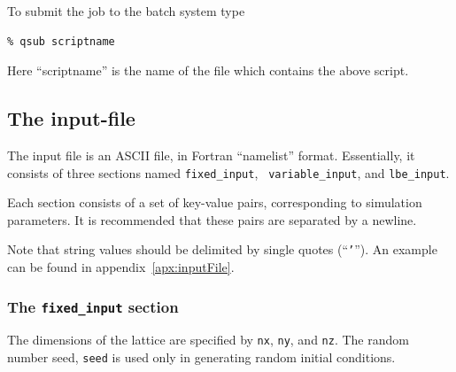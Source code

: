 \documentclass[a4paper]{article}
\begin{document}
To submit the job to the batch system type 
\begin{verbatim}
% qsub scriptname 
\end{verbatim}

Here ``scriptname'' is the name of the file which contains the above script.


\subsection{The input-file}
\label{sec:inputFile}

The input file is an ASCII file, in Fortran ``namelist'' format.
Essentially, it consists of three sections named {\tt fixed\_input}, {\tt
variable\_input}, and {\tt lbe\_input}. 

Each section consists of a set of key-value pairs, corresponding to
simulation parameters. It is recommended that these pairs are separated
by a newline.

Note that string values should be delimited by single quotes (``{\tt '}''). An example can be found in appendix~\ref{apx:inputFile}.

\subsubsection{The {\tt fixed\_input} section}
\label{sec:fixedInput}
The dimensions of the lattice are specified by {\tt nx}, {\tt ny}, and
{\tt nz}. The random number seed, {\tt seed} is used only in generating
random initial conditions.
\end{document}
